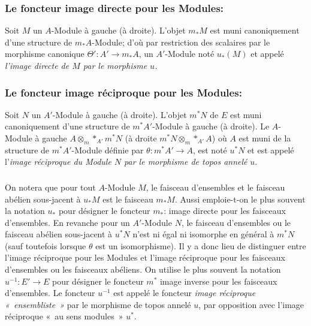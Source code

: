 \subsubsection{Le foncteur image directe pour les
  Modules:}
Soit $M$ un $A$-Module à gauche (\resp à droite). L'objet
$m_{\ast}M$ est muni canoniquement d'une structure de
$m_{\ast}A$-Module; d'où par restriction des scalaires par le
morphisme canonique $\Theta':A'\rightarrow m_{\ast}A$, un
$A'$-Module noté $u_{\ast}(M)$ et appelé \emph{l'image directe de
$M$ par le morphisme $u$.}

\subsubsection{Le foncteur image réciproque pour les
  Modules:}
Soit $N$ un $A'$-Module à gauche (\resp à droite). L'objet
$m^{\ast}N$ de $E$ est muni canoniquement d'une structure de
$m^{\ast}A'$-Module à gauche (\resp à droite). Le $A$-Module à
gauche $A\otimes_m\ast_{A'}m^{\ast}N$ (\resp à droite
$m^{\ast}N\otimes_m\ast_{A'}A$) où $A$ est muni de la structure de
$m^{\ast}A'$-Module définie par $\theta:m^{\ast}A'\rightarrow A$,
est noté $u^{\ast}N$ et est appelé l'\emph{image réciproque du
Module $N$ par le morphisme de topos annelé} $u$.

\subsubsection{}
On notera que pour tout $A$-Module $M$, le faisceau d'ensembles et
le faisceau abélien sous-jacent à $u_{\ast}M$ est le faisceau
$m_{\ast}M$. Aussi emploie-t-on le plus souvent la notation
$u_{\ast}$ pour désigner le foncteur $m_{\ast}$: image directe pour
les faisceaux d'ensembles. En revanche pour un $A'$-Module $N$, le
faisceau d'ensembles ou le faisceau abélien sous-jacent à
$u^{\ast}N$ n'est ni égal ni isomorphe en général à $m^{\ast}N$
(sauf toutefois lorsque $\theta$ est un isomorphisme). Il y a donc
lieu de distinguer entre l'image réciproque pour les Modules et
l'image réciproque pour les faisceaux d'ensembles ou les faisceaux
abéliens. On utilise le plus souvent la notation
$u^{-1}:E'\rightarrow E$ pour désigner le foncteur $m^{\ast}$ image
inverse pour les faisceaux d'ensembles. Le foncteur $u^{-1}$ est
appelé le foncteur \emph{image réciproque « ensembliste »} par
le morphisme de topos annelé $u$, par opposition avec l'image
réciproque « au sens modules »  $u^{\ast}$.

